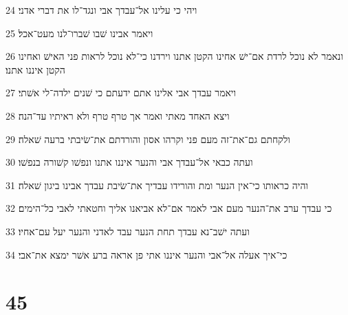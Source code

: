 \par 24 ויהי כי עלינו אל־עבדך אבי ונגד־לו את דברי אדני׃
\par 25 ויאמר אבינו שׁבו שׁברו־לנו מעט־אכל׃
\par 26 ונאמר לא נוכל לרדת אם־ישׁ אחינו הקטן אתנו וירדנו כי־לא נוכל לראות פני האישׁ ואחינו הקטן איננו אתנו׃
\par 27 ויאמר עבדך אבי אלינו אתם ידעתם כי שׁנים ילדה־לי אשׁתי׃
\par 28 ויצא האחד מאתי ואמר אך טרף טרף ולא ראיתיו עד־הנה׃
\par 29 ולקחתם גם־את־זה מעם פני וקרהו אסון והורדתם את־שׂיבתי ברעה שׁאלה׃
\par 30 ועתה כבאי אל־עבדך אבי והנער איננו אתנו ונפשׁו קשׁורה בנפשׁו׃
\par 31 והיה כראותו כי־אין הנער ומת והורידו עבדיך את־שׂיבת עבדך אבינו ביגון שׁאלה׃
\par 32 כי עבדך ערב את־הנער מעם אבי לאמר אם־לא אביאנו אליך וחטאתי לאבי כל־הימים׃
\par 33 ועתה ישׁב־נא עבדך תחת הנער עבד לאדני והנער יעל עם־אחיו׃
\par 34 כי־איך אעלה אל־אבי והנער איננו אתי פן אראה ברע אשׁר ימצא את־אבי׃

\chapter{45}

